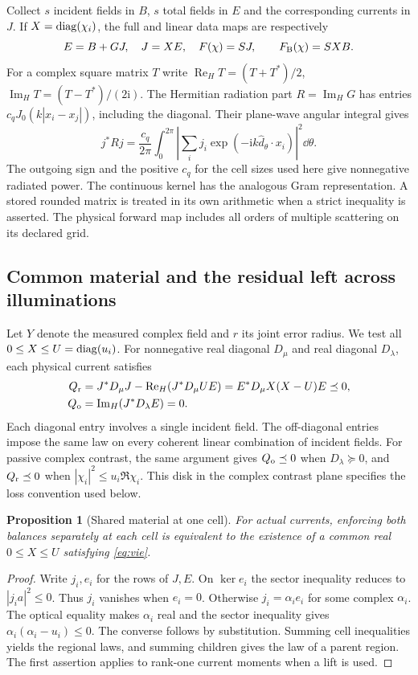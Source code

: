 \documentclass[anonymous,12pt]{iopjournal}
\newtheorem{proposition}[theorem]{Proposition}
\newcommand{\Herm}{\operatorname{Re}_{H}}\newcommand{\Imag}{\operatorname{Im}_{H}}
\numberwithin{equation}{section}
\begin{document}
Collect $s$ incident fields in $B$, $s$ total fields in $E$ and the corresponding currents in $J$. If $X=\operatorname{diag}(\chi_i)$, the full and linear data maps are respectively
\begin{equation}
 E=B+GJ,\quad J=XE,\quad F(\chi)=SJ,\qquad F_{\rm B}(\chi)=SXB .
 \label{eq:vie}
\end{equation}
For a complex square matrix $T$ write $\Herm T=(T+T^*)/2$, $\Imag T=(T-T^*)/(2\mathrm i)$. The Hermitian radiation part $R=\Imag G$ has entries $c_q J_0(k|x_i-x_j|)$, including the diagonal. Their plane-wave angular integral gives
\begin{equation}
 j^*Rj=\frac{c_q}{2\pi}\int_0^{2\pi}
 \left|\sum_i j_i\exp(-\mathrm i k\widehat d_\theta\cdot x_i)\right|^2\dd\theta .
 \label{eq:power}
\end{equation}
The outgoing sign and the positive $c_q$ for the cell sizes used here give nonnegative radiated power. The continuous kernel has the analogous Gram representation. A stored rounded matrix is treated in its own arithmetic when a strict inequality is asserted. The physical forward map includes all orders of multiple scattering on its declared grid.

\subsection{Common material and the residual left across illuminations}
Let $Y$ denote the measured complex field and $r$ its joint error radius. We test all $0\le X\le U=\operatorname{diag}(u_i)$. For nonnegative real diagonal $D_\mu$ and real diagonal $D_\lambda$, each physical current satisfies
\begin{align}
 Q_{\rm r}&=J^*D_\mu J-\Herm(J^*D_\mu U E)
       =E^*D_\mu X(X-U)E\preceq0,\nonumber\\
 Q_{\rm o}&=\Imag(J^*D_\lambda E)=0 .\label{eq:balance}
\end{align}
Each diagonal entry involves a single incident field. The off-diagonal entries impose the same law on every coherent linear combination of incident fields. For passive complex contrast, the same argument gives $Q_{\rm o}\preceq0$ when $D_\lambda\succeq0$, and $Q_{\rm r}\preceq0$ when $|\chi_i|^2\le u_i\Re\chi_i$. This disk in the complex contrast plane specifies the loss convention used below.

\begin{proposition}[Shared material at one cell]\label{prop:pixel}
For actual currents, enforcing both balances separately at each cell is equivalent to the existence of a common real $0\le X\le U$ satisfying \eqref{eq:vie}.
\end{proposition}
\begin{proof}
Write $j_i,e_i$ for the rows of $J,E$. On $\ker e_i$ the sector inequality reduces to $|j_i a|^2\le0$. Thus $j_i$ vanishes when $e_i=0$. Otherwise $j_i=\alpha_i e_i$ for some complex $\alpha_i$. The optical equality makes $\alpha_i$ real and the sector inequality gives $\alpha_i(\alpha_i-u_i)\le0$. The converse follows by substitution. Summing cell inequalities yields the regional laws, and summing children gives the law of a parent region. The first assertion applies to rank-one current moments when a lift is used.
\end{proof}
\end{document}
